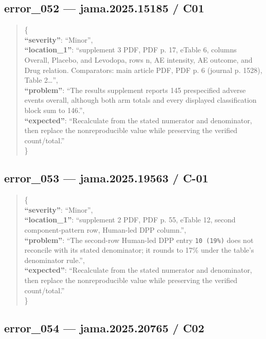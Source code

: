 \documentclass[
  letterpaper,
  9pt]{extreport}
\begin{document}
\hypertarget{error_052--jama202515185--c01}{%
\subsection{error\_052 --- jama.2025.15185 /
C01}\label{error_052--jama202515185--c01}}

\begin{quote}
\{\\
\textbf{``severity''}: ``Minor'',\\
\textbf{``location\_1''}: ``supplement 3 PDF, PDF p. 17, eTable 6,
columns Overall, Placebo, and Levodopa, rows n, AE intensity, AE
outcome, and Drug relation. Comparators: main article PDF, PDF p. 6
(journal p. 1528), Table 2\ldots{}'',\\
\textbf{``problem''}: ``The results supplement reports 145 prespecified
adverse events overall, although both arm totals and every displayed
classification block sum to 146.'',\\
\textbf{``expected''}: ``Recalculate from the stated numerator and
denominator, then replace the nonreproducible value while preserving the
verified count/total.''\\
\}
\end{quote}

\hypertarget{error_053--jama202519563--c-01}{%
\subsection{error\_053 --- jama.2025.19563 /
C-01}\label{error_053--jama202519563--c-01}}

\begin{quote}
\{\\
\textbf{``severity''}: ``Minor'',\\
\textbf{``location\_1''}: ``supplement 2 PDF, PDF p. 55, eTable 12,
second component-pattern row, Human-led DPP column.'',\\
\textbf{``problem''}: ``The second-row Human-led DPP entry
\texttt{10\ (19\%)} does not reconcile with its stated denominator; it
rounds to 17\% under the table's denominator rule.'',\\
\textbf{``expected''}: ``Recalculate from the stated numerator and
denominator, then replace the nonreproducible value while preserving the
verified count/total.''\\
\}
\end{quote}

\hypertarget{error_054--jama202520765--c02}{%
\subsection{error\_054 --- jama.2025.20765 /
C02}\label{error_054--jama202520765--c02}}
\end{document}
